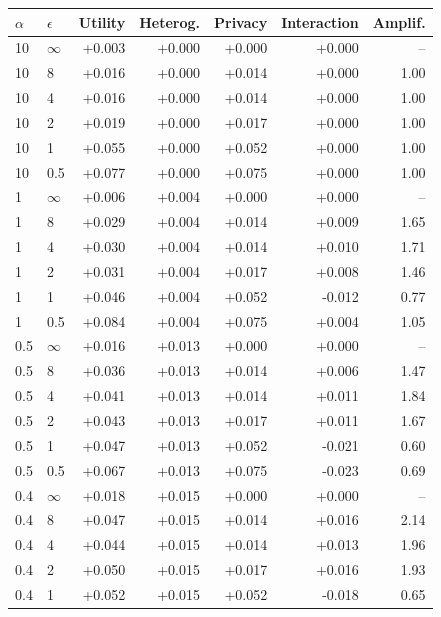 \begin{tabular}{@{}llrrrrr@{}}
\toprule
$\alpha$ & $\epsilon$ & Utility & Heterog. & Privacy & Interaction & Amplif. \\
\midrule
10 & $\infty$ & +0.003 & +0.000 & +0.000 & +0.000 & -- \\
10 & 8 & +0.016 & +0.000 & +0.014 & +0.000 & 1.00 \\
10 & 4 & +0.016 & +0.000 & +0.014 & +0.000 & 1.00 \\
10 & 2 & +0.019 & +0.000 & +0.017 & +0.000 & 1.00 \\
10 & 1 & +0.055 & +0.000 & +0.052 & +0.000 & 1.00 \\
10 & 0.5 & +0.077 & +0.000 & +0.075 & +0.000 & 1.00 \\
1 & $\infty$ & +0.006 & +0.004 & +0.000 & +0.000 & -- \\
1 & 8 & +0.029 & +0.004 & +0.014 & +0.009 & 1.65 \\
1 & 4 & +0.030 & +0.004 & +0.014 & +0.010 & 1.71 \\
1 & 2 & +0.031 & +0.004 & +0.017 & +0.008 & 1.46 \\
1 & 1 & +0.046 & +0.004 & +0.052 & -0.012 & 0.77 \\
1 & 0.5 & +0.084 & +0.004 & +0.075 & +0.004 & 1.05 \\
0.5 & $\infty$ & +0.016 & +0.013 & +0.000 & +0.000 & -- \\
0.5 & 8 & +0.036 & +0.013 & +0.014 & +0.006 & 1.47 \\
0.5 & 4 & +0.041 & +0.013 & +0.014 & +0.011 & 1.84 \\
0.5 & 2 & +0.043 & +0.013 & +0.017 & +0.011 & 1.67 \\
0.5 & 1 & +0.047 & +0.013 & +0.052 & -0.021 & 0.60 \\
0.5 & 0.5 & +0.067 & +0.013 & +0.075 & -0.023 & 0.69 \\
0.4 & $\infty$ & +0.018 & +0.015 & +0.000 & +0.000 & -- \\
0.4 & 8 & +0.047 & +0.015 & +0.014 & +0.016 & 2.14 \\
0.4 & 4 & +0.044 & +0.015 & +0.014 & +0.013 & 1.96 \\
0.4 & 2 & +0.050 & +0.015 & +0.017 & +0.016 & 1.93 \\
0.4 & 1 & +0.052 & +0.015 & +0.052 & -0.018 & 0.65 \\

\end{tabular}
